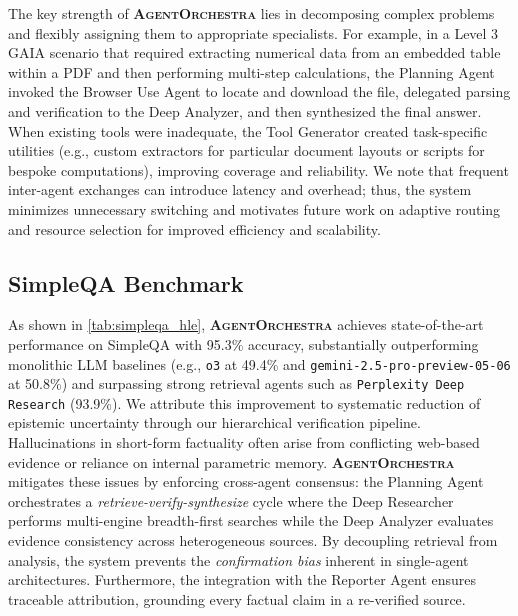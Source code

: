 \documentclass[11pt]{article}
\newcommand{\projectname}{\textbf{\textsc{AgentOrchestra}}\xspace}
\begin{document}
The key strength of \projectname lies in decomposing complex problems and flexibly assigning them to appropriate specialists. For example, in a Level 3 GAIA scenario that required extracting numerical data from an embedded table within a PDF and then performing multi-step calculations, the Planning Agent invoked the Browser Use Agent to locate and download the file, delegated parsing and verification to the Deep Analyzer, and then synthesized the final answer. When existing tools were inadequate, the Tool Generator created task-specific utilities (e.g., custom extractors for particular document layouts or scripts for bespoke computations), improving coverage and reliability. We note that frequent inter-agent exchanges can introduce latency and overhead; thus, the system minimizes unnecessary switching and motivates future work on adaptive routing and resource selection for improved efficiency and scalability.

\subsection{SimpleQA Benchmark}
As shown in \cref{tab:simpleqa_hle}, \projectname achieves state-of-the-art performance on SimpleQA with 95.3\% accuracy, substantially outperforming monolithic LLM baselines (e.g., \texttt{o3} at 49.4\% and \texttt{gemini-2.5-pro-preview-05-06} at 50.8\%) and surpassing strong retrieval agents such as \texttt{Perplexity Deep Research} (93.9\%). We attribute this improvement to systematic reduction of epistemic uncertainty through our hierarchical verification pipeline. Hallucinations in short-form factuality often arise from conflicting web-based evidence or reliance on internal parametric memory. \projectname mitigates these issues by enforcing cross-agent consensus: the Planning Agent orchestrates a \textit{retrieve-verify-synthesize} cycle where the Deep Researcher performs multi-engine breadth-first searches while the Deep Analyzer evaluates evidence consistency across heterogeneous sources. By decoupling retrieval from analysis, the system prevents the \textit{confirmation bias} inherent in single-agent architectures. Furthermore, the integration with the Reporter Agent ensures traceable attribution, grounding every factual claim in a re-verified source.
\end{document}
